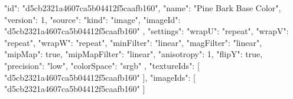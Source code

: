 {
  "id": "d5cb2321a4607ca5b04412f5caafb160",
  "name": "Pine Bark Base Color",
  "version": 1,
  "source": {
    "kind": "image",
    "imageId": "d5cb2321a4607ca5b04412f5caafb160"
  },
  "settings": {
    "wrapU": "repeat",
    "wrapV": "repeat",
    "wrapW": "repeat",
    "minFilter": "linear",
    "magFilter": "linear",
    "mipMap": true,
    "mipMapFilter": "linear",
    "anisotropy": 1,
    "flipY": true,
    "precision": "low",
    "colorSpace": "srgb"
  },
  "textureIds": [
    "d5cb2321a4607ca5b04412f5caafb160"
  ],
  "imageIds": [
    "d5cb2321a4607ca5b04412f5caafb160"
  ]
}
